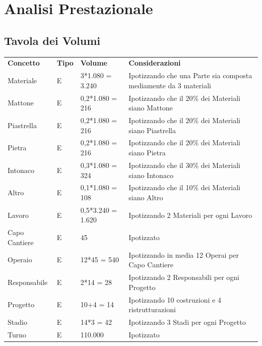 \documentclass[12pt,a4paper]{report}
\begin{document}
\part{Analisi Prestazionale}

    \chapter{Tavola dei Volumi}
        \begin{center}
            \begin{tabular}{|p{4cm}|p{1cm}|p{3cm}|p{8cm}|}
                \hline
                \rowcolor{celeste}\multicolumn{4}{|c|}{\textbf{Area Costruzione}} \\ \hline
                \textbf{Concetto} & \textbf{Tipo} & \textbf{Volume} & \textbf{Considerazioni} \\ \hline
                Materiale & E & 3*1.080 = 3.240 & Ipotizzando che una Parte sia composta mediamente da 3 materiali \\ \hline
                Mattone & E & 0,2*1.080 = 216 & Ipotizzando che il 20\% dei Materiali siano Mattone \\ \hline
                Piastrella & E & 0,2*1.080 = 216 & Ipotizzando che il 20\% dei Materiali siano Piastrella \\ \hline
                Pietra & E & 0,2*1.080 = 216 & Ipotizzando che il 20\% dei Materiali siano Pietra \\ \hline
                Intonaco & E & 0,3*1.080 =  324 & Ipotizzando che il 30\% dei Materiali siano Intonaco \\ \hline
                Altro & E & 0,1*1.080 = 108 & Ipotizzando che il 10\% dei Materiali siano Altro \\ \hline
                Lavoro & E & 0,5*3.240 = 1.620 & Ipotizzando 2 Materiali per ogni Lavoro \\ \hline
                Capo Cantiere & E & 45 & Ipotizzato \\ \hline
                Operaio & E & 12*45 = 540 & Ipotizzando in media 12 Operai per Capo Cantiere \\ \hline
                Responsabile & E & 2*14 = 28 & Ipotizzando 2 Responsabili per ogni Progetto \\ \hline
                Progetto & E & 10+4 = 14 & Ipotizzando 10 costruzioni e 4 ristrutturazioni \\ \hline
                Stadio & E & 14*3 = 42 & Ipotizzando 3 Stadi per ogni Progetto \\ \hline
                Turno & E & 110.000 & Ipotizzato \\ \hline

\end{tabular}
\end{center}
\end{document}
